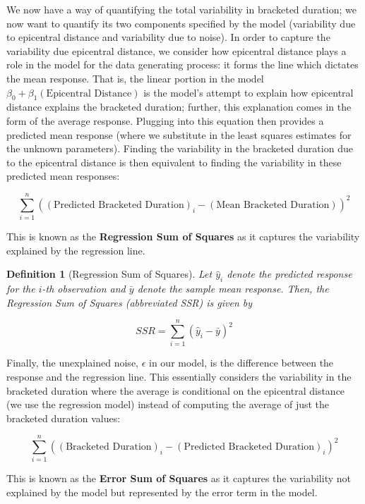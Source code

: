 \documentclass[
]{book}
\theoremstyle{plain}
\theoremstyle{mydefn}
\newtheorem{definition}{Definition}[chapter]
\theoremstyle{myexmpl}
\theoremstyle{remark}
\begin{document}
We now have a way of quantifying the total variability in bracketed duration; we now want to quantify its two components specified by the model (variability due to epicentral distance and variability due to noise). In order to capture the variability due epicentral distance, we consider how epicentral distance plays a role in the model for the data generating process: it forms the line which dictates the mean response. That is, the linear portion in the model \(\beta_0 + \beta_1 (\text{Epicentral Distance})\) is the model's attempt to explain how epicentral distance explains the bracketed duration; further, this explanation comes in the form of the average response. Plugging into this equation then provides a predicted mean response (where we substitute in the least squares estimates for the unknown parameters). Finding the variability in the bracketed duration due to the epicentral distance is then equivalent to finding the variability in these predicted mean responses:

\[\sum_{i=1}^{n} \left((\text{Predicted Bracketed Duration})_i - (\text{Mean Bracketed Duration})\right)^2\]

This is known as the \textbf{Regression Sum of Squares} as it captures the variability explained by the regression line.

\begin{definition}[Regression Sum of Squares]
\protect\hypertarget{def:defn-ssr}{}{\label{def:defn-ssr} {} }Let \(\widehat{y}_i\) denote the predicted response for the \(i\)-th observation and \(\bar{y}\) denote the sample mean response. Then, the Regression Sum of Squares (abbreviated SSR) is given by

\[SSR = \sum_{i=1}^{n} \left(\widehat{y}_i - \bar{y}\right)^2\]
\end{definition}

Finally, the unexplained noise, \(\epsilon\) in our model, is the difference between the response and the regression line. This essentially considers the variability in the bracketed duration where the average is conditional on the epicentral distance (we use the regression model) instead of computing the average of just the bracketed duration values:

\[\sum_{i=1}^{n} \left((\text{Bracketed Duration})_i - (\text{Predicted Bracketed Duration})_i\right)^2\]

This is known as the \textbf{Error Sum of Squares} as it captures the variability not explained by the model but represented by the error term in the model.
\end{document}
